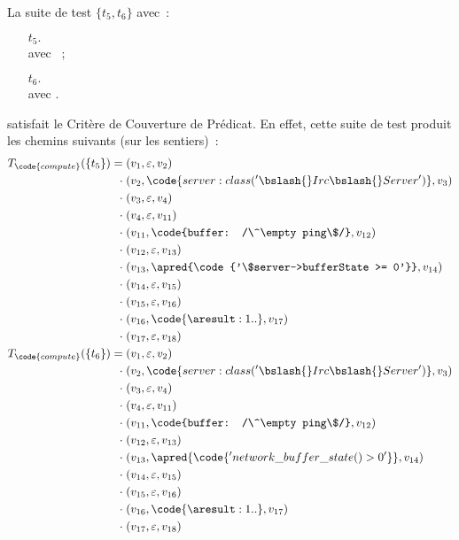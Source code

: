 \begin{example}

La suite de test $\{t_5, t_6\}$ avec~:
%
\begin{itemize}

\item[$t_5.$]  \\
avec ~;

\item[$t_6.$]  \\
avec .

\end{itemize}
%
satisfait le Critère de Couverture de Prédicat. En effet, cette suite de test
produit les chemins suivants (sur les sentiers)~:
%
\begin{align*}
%
T_\code{compute}(\{t_5\}) =\;
          & (v_1, \varepsilon, v_2) \\
  \cdot\; & (v_2, \code{server: class('\bslash{}Irc\bslash{}Server')}, v_3) \\
  \cdot\; & (v_3, \varepsilon, v_4) \\
  \cdot\; & (v_4, \varepsilon, v_{11}) \\
  \cdot\; & (v_{11}, \code{buffer: /\^\empty ping\$/}, v_{12}) \\
  \cdot\; & (v_{12}, \varepsilon, v_{13}) \\
  \cdot\; & (v_{13}, \apred{\code{'\$server->bufferState >= 0'}}, v_{14}) \\
  \cdot\; & (v_{14}, \varepsilon, v_{15}) \\
  \cdot\; & (v_{15}, \varepsilon, v_{16}) \\
  \cdot\; & (v_{16}, \code{\aresult: 1..}, v_{17}) \\
  \cdot\; & (v_{17}, \varepsilon, v_{18}) \\
%
T_\code{compute}(\{t_6\}) =\;
          & (v_1, \varepsilon, v_2) \\
  \cdot\; & (v_2, \code{server: class('\bslash{}Irc\bslash{}Server')}, v_3) \\
  \cdot\; & (v_3, \varepsilon, v_4) \\
  \cdot\; & (v_4, \varepsilon, v_{11}) \\
  \cdot\; & (v_{11}, \code{buffer: /\^\empty ping\$/}, v_{12}) \\
  \cdot\; & (v_{12}, \varepsilon, v_{13}) \\
  \cdot\; & (v_{13}, \apred{\code{'network\_buffer\_state() > 0'}}, v_{14}) \\
  \cdot\; & (v_{14}, \varepsilon, v_{15}) \\
  \cdot\; & (v_{15}, \varepsilon, v_{16}) \\
  \cdot\; & (v_{16}, \code{\aresult: 1..}, v_{17}) \\
  \cdot\; & (v_{17}, \varepsilon, v_{18}) \\
%
\end{align*}

\end{example}

